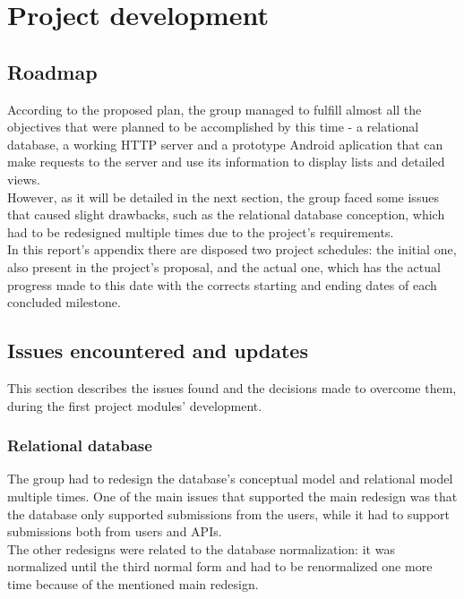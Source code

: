 %
%
\chapter{Project development}
    
	\section{Roadmap}

    According to the proposed plan, the group managed to fulfill almost all the objectives
    that were planned to be accomplished by this time - a relational database, a working HTTP server
    and a prototype Android aplication that can make requests to the server and 
    use its information to display lists and detailed views.\\

    However, as it will be detailed in the next section, the group faced some issues that caused slight
    drawbacks, such as the relational database conception, which had to be redesigned multiple
    times due to the project's requirements.\\

    In this report's appendix there are disposed two project schedules: the initial one, also present in the
    project's proposal, and the actual one, which has the actual progress made to this date with the corrects starting
    and ending dates of each concluded milestone.


    \section{Issues encountered and updates}

    This section describes the issues found and the decisions made
    to overcome them, during the first project modules' development.
    
    \subsection{Relational database}

    The group had to redesign the database's conceptual model and relational model multiple times.
    One of the main issues that supported the main redesign was that the database 
    only supported submissions from the users, while it had to support submissions both from users and APIs.\\

    The other redesigns were related to the database normalization: it was normalized until the third normal form 
    and had to be renormalized one more time because of the mentioned main redesign.\\ 

